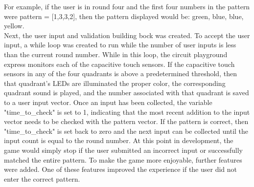 \documentclass[12pt]{article}
\begin{document}
For example, if the user is in round four and the first four numbers in the pattern were pattern = [1,3,3,2], then the pattern displayed would be: green, blue, blue, yellow.
\vspace*{0.5cm}
\\
Next, the user input and validation building bock was created. To accept the user input, a while loop was created to run while the number of user inputs is less than the current round number. While in this loop, the circuit playground express monitors each of the capacitive touch sensors. If the capacitive touch sensors in any of the four quadrants is above a predetermined threshold, then that quadrant's LEDs are illuminated the proper color, the corresponding quadrant sound is played, and the number associated with that quadrant is saved to a user input vector. Once an input has been collected, the variable "time\_to\_check" is set to 1, indicating that the most recent addition to the input vector needs to be checked with the pattern vector. If the pattern is correct, then "time\_to\_check" is set back to zero and the next input can be collected until the input count is equal to the round number. At this point in development, the game would simply stop if the user submitted an incorrect input or successfully matched the entire pattern. To make the game more enjoyable, further features were added. One of these features improved the experience if the user did not enter the correct pattern.
\end{document}

